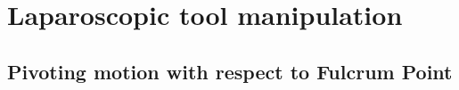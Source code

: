 \section{Laparoscopic tool manipulation}

\subsection{Pivoting motion with respect to Fulcrum Point}